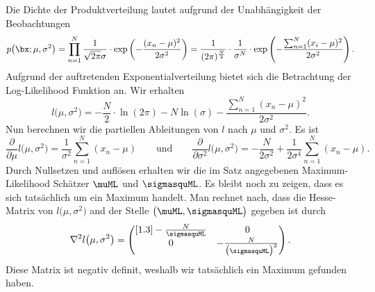 \begin{frame}{}{}
	\begin{myproof}
		Die Dichte der Produktverteilung lautet aufgrund der Unabhängigkeit der Beobachtungen
		\begin{equation*}
			p\bigl( \bx; \mu, \sigma^2 \bigr)
				= \prod_{n=1}^N \frac{1}{\sqrt{2 \pi} \sigma} \cdot \exp\left( -\frac{(x_n - \mu)^2}{2 \sigma^2} \right)
				= \frac{1}{(2 \pi)^{\frac{N}{2}}} \cdot \frac{1}{\sigma^N}
					\cdot \exp\left( -\frac{\sum_{n=1}^N (x_i - \mu)^2}{2 \sigma^2} \right).
		\end{equation*}
		Aufgrund der auftretenden Exponentialverteilung bietet sich die Betrachtung der Log-Likelihood Funktion an.
		Wir erhalten
		\begin{equation*}
			l\bigl( \mu, \sigma^2 \bigr)
				= -\frac{N}{2} \cdot \ln(2 \pi) - N \ln(\sigma) - \frac{\sum_{n=1}^N (x_n - \mu)^2}{2 \sigma^2}.
		\end{equation*}
		Nun berechnen wir die partiellen Ableitungen von $l$ nach $\mu$ und $\sigma^2$. Es ist
		\begin{equation*}
			\frac{\partial}{\partial \mu} l\bigl( \mu, \sigma^2 \bigr)
				= \frac{1}{\sigma^2} \sum_{n=1}^N (x_n - \mu)
		\qquad\text{und}\qquad
			\frac{\partial}{\partial \sigma^2} l\bigl( \mu, \sigma^2 \bigr)
				= -\frac{N}{2 \sigma^2} + \frac{1}{2 \sigma^4} \sum_{n=1}^N (x_n - \mu).
		\end{equation*}
		Durch Nullsetzen und auflösen erhalten wir die im Satz angegebenen Maximum-Likelihood Schätzer
		$\muML$ und $\sigmasquML$.
		Es bleibt noch zu zeigen, dass es sich tatsächlich um ein Maximum handelt. Man rechnet nach,
		dass die Hesse-Matrix von $l\bigl( \mu, \sigma^2 \bigr)$ and der Stelle $\bigl( \muML, \sigmasquML \bigr)$
		gegeben ist durch
		\begin{equation*}
			\nabla^2 l\bigl( \mu, \sigma^2 \bigr) =
			\begin{pmatrix}[1.3] -\frac{N}{\sigmasquML} & 0 \\ 0 & -\frac{N}{\bigl( \sigmasquML \bigr)^2} \end{pmatrix}.
		\end{equation*}
		Diese Matrix ist negativ definit, weshalb wir tatsächlich ein Maximum gefunden haben.
	\end{myproof}
\end{frame}


